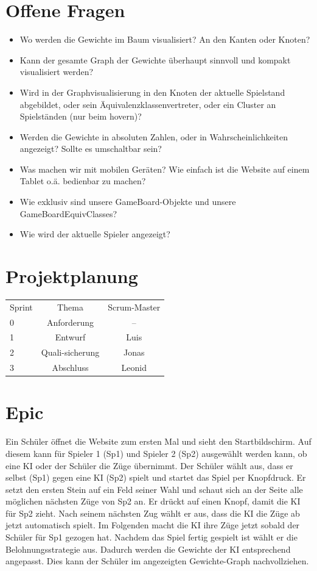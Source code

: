 \documentclass[titlepage]{scrartcl}
\begin{document}
\section{Offene Fragen}
\begin{itemize}
	\item Wo werden die Gewichte im Baum visualisiert? An den Kanten oder Knoten?
	\item Kann der gesamte Graph der Gewichte überhaupt sinnvoll und kompakt visualisiert werden?
	\item Wird in der Graphvisualisierung in den Knoten der aktuelle Spielstand abgebildet, oder sein Äquivalenzklassenvertreter, oder ein Cluster an Spielständen (nur beim hovern)?
	\item Werden die Gewichte in absoluten Zahlen, oder in Wahrscheinlichkeiten angezeigt? Sollte es umschaltbar sein?
	\item Was machen wir mit mobilen Geräten? Wie einfach ist die Website auf einem Tablet o.ä. bedienbar zu machen?
	\item Wie exklusiv sind unsere GameBoard-Objekte und unsere GameBoardEquivClasses?
	\item Wie wird der aktuelle Spieler angezeigt?
\end{itemize}


\section{Projektplanung}%
\begin{tabular}{lcc}
	Sprint &Thema& Scrum-Master\\
	0&Anforderung&--\\
	1&Entwurf & Luis\\
	2&Quali-sicherung & Jonas \\
	3&Abschluss & Leonid\\
\end{tabular}


\section{Epic}

Ein Schüler öffnet die Website zum ersten Mal und sieht den Startbildschirm.
Auf diesem kann für Spieler 1 (Sp1) und Spieler 2 (Sp2) ausgewählt werden kann, ob eine KI oder der Schüler die Züge übernimmt.
Der Schüler wählt aus, dass er selbst (Sp1) gegen eine KI (Sp2) spielt und startet das Spiel per Knopfdruck.
Er setzt den ersten Stein auf ein Feld seiner Wahl und schaut sich an der Seite alle möglichen nächsten Züge von Sp2 an.
Er drückt auf einen Knopf, damit die KI für Sp2 zieht.
Nach seinem nächsten Zug wählt er aus, dass die KI die Züge ab jetzt automatisch spielt.
Im Folgenden macht die KI ihre Züge jetzt sobald der Schüler für Sp1 gezogen hat.
Nachdem das Spiel fertig gespielt ist wählt er die Belohnungsstrategie aus.
Dadurch werden die Gewichte der KI entsprechend angepasst.
Dies kann der Schüler im angezeigten Gewichte-Graph nachvollziehen.
\end{document}
